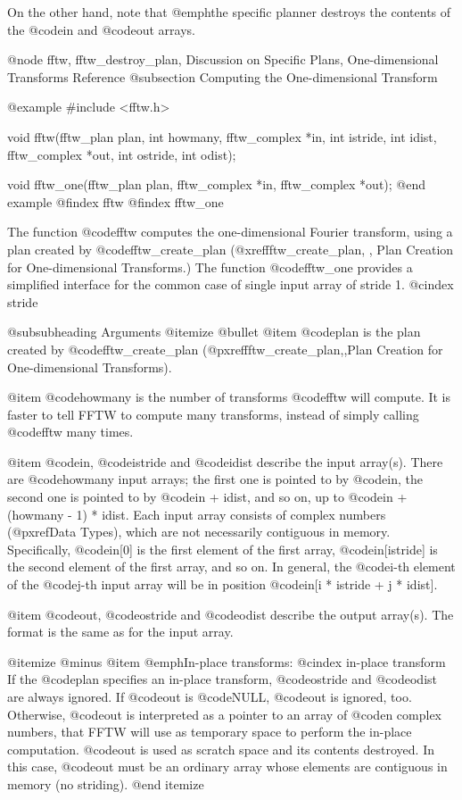 On the other hand, note that @emph{the specific planner destroys the
contents of the @code{in} and @code{out} arrays}.

@node    fftw, fftw_destroy_plan, Discussion on Specific Plans, One-dimensional Transforms Reference
@subsection Computing the One-dimensional Transform

@example
#include <fftw.h>

void fftw(fftw_plan plan, int howmany,
          fftw_complex *in, int istride, int idist,
          fftw_complex *out, int ostride, int odist);

void fftw_one(fftw_plan plan, fftw_complex *in, 
          fftw_complex *out);
@end example
@findex fftw
@findex fftw_one

The function @code{fftw} computes the one-dimensional Fourier transform,
using a plan created by @code{fftw_create_plan} (@xref{fftw_create_plan,
, Plan Creation for One-dimensional Transforms}.)  The function
@code{fftw_one} provides a simplified interface for the common case of
single input array of stride 1.
@cindex stride

@subsubheading Arguments
@itemize @bullet
@item
@code{plan} is the plan created by @code{fftw_create_plan}
(@pxref{fftw_create_plan,,Plan Creation for One-dimensional Transforms}).

@item
@code{howmany} is the number of transforms @code{fftw} will compute.
It is faster to tell FFTW to compute many transforms, instead of
simply calling @code{fftw} many times.

@item
@code{in}, @code{istride} and @code{idist} describe the input array(s).
There are @code{howmany} input arrays; the first one is pointed to by
@code{in}, the second one is pointed to by @code{in + idist}, and so on,
up to @code{in + (howmany - 1) * idist}.  Each input array consists of
complex numbers (@pxref{Data Types}), which are not necessarily
contiguous in memory.  Specifically, @code{in[0]} is the first element
of the first array, @code{in[istride]} is the second element of the
first array, and so on.  In general, the @code{i}-th element of the
@code{j}-th input array will be in position @code{in[i * istride + j *
idist]}.

@item
@code{out}, @code{ostride} and @code{odist} describe the output
array(s).  The format is the same as for the input array.

@itemize @minus
@item @emph{In-place transforms}:
@cindex in-place transform
If the @code{plan} specifies an in-place transform, @code{ostride} and
@code{odist} are always ignored.  If @code{out} is @code{NULL},
@code{out} is ignored, too.  Otherwise, @code{out} is interpreted as a
pointer to an array of @code{n} complex numbers, that FFTW will use as
temporary space to perform the in-place computation.  @code{out} is used
as scratch space and its contents destroyed.  In this case, @code{out}
must be an ordinary array whose elements are contiguous in memory (no
striding).
@end itemize

